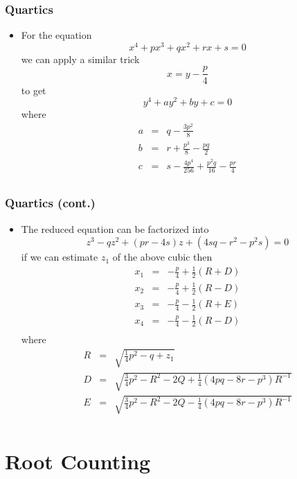 \documentclass[10pt]{beamer}
\begin{document}
\begin{frame}
  \frametitle{Quartics}
  \begin{itemize}
  \item For the equation
    \[
      x^4 + p x^3 + q x^2 + r x + s =0
    \] we can apply a similar trick
    \[
      x = y - \frac{p}{4}
    \]
    to get
    \[
      y^4 + a y^2 + b y + c = 0
    \]
    where
    \[
      \begin{array}{rcl}
        a& = & q - \frac{3p^2}{8}\\
        b& = & r + \frac{p^3}{8} - \frac{pq}{2}\\
        c& = & s - \frac{4p^4}{256} + \frac{p^2 q}{16} - \frac{pr}{4}\\
      \end{array}
    \]
  \end{itemize}
\end{frame}
\begin{frame}
  \frametitle{Quartics (cont.)}
  \begin{itemize}
  \item The reduced equation can be factorized into
    \[
      z^3 - q z^2 + (pr-4s) z + (4sq - r^2 - p^2s) = 0
    \]
    if we can estimate $z_1$ of the above cubic then
    \[
      \begin{array}{rcl}
        x_1 &= & -\frac{p}{4} + \frac{1}{2} (R+D) \\
        x_2 &= & -\frac{p}{4} + \frac{1}{2} (R-D) \\
        x_3 &= & -\frac{p}{4} - \frac{1}{2} (R+E) \\
        x_4 &= & -\frac{p}{4} - \frac{1}{2} (R-D) \\
      \end{array}
    \] where
    \[
      \begin{array}{rcl}  
        R &=& \sqrt{\frac{1}{4} p^2 - q + z_1} \\
        D &=& \sqrt{\frac{3}{4} p^2 - R^2 - 2Q + \frac{1}{4}(4pq - 8r - p^3) R^{-1}}\\
        E &=& \sqrt{\frac{3}{4} p^2 - R^2 - 2Q - \frac{1}{4}(4pq - 8r - p^3) R^{-1}}\\
      \end{array}
    \]
  \end{itemize}
\end{frame}


\section{Root Counting}
\end{document}
